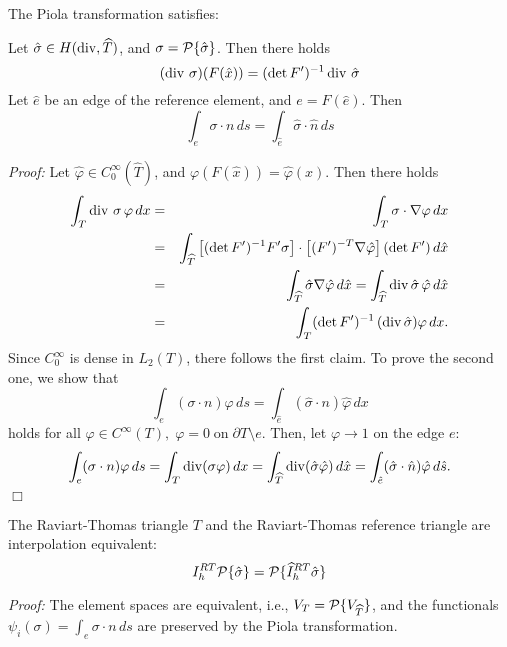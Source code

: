 The Piola transformation satisfies:
\begin{lemma} Let $\hat \sigma \in H(\operatorname{div}, \widehat T)$, and 
$\sigma = {\cal P} \{ \hat \sigma \}$. Then there holds
$$
(\operatorname{div} \, \sigma) (F (\hat x)) = (\det F^\prime)^{-1} \operatorname{div} \, \hat \sigma
$$
Let $\hat e$ be an edge of the reference element, and $e = F (\hat e)$.
Then
$$
\int_e \sigma \cdot n \, ds = \int_{\hat e} \hat \sigma \cdot \hat n \, ds
$$
\end{lemma}
{\em Proof:} Let $\widehat \varphi \in C_0^\infty (\widehat T)$, 
and $\varphi(F(\hat x)) = \widehat \varphi (x)$. Then there holds
\begin{eqnarray*}
\int_T \operatorname{div} \, \sigma \, \varphi \, dx & = & \int_T \sigma \cdot \nabla \varphi \, dx  \\
& = & \int_{\widehat T} \left[ (\operatorname{det} F^\prime)^{-1} F^\prime \sigma \right] \cdot \left[ (F^\prime)^{-T} \nabla \hat \varphi \right] (\operatorname{det} F^\prime) \, d \hat x \\
& = & \int_{\widehat T} \hat \sigma \nabla \hat \varphi \, d \hat x 
= \int_{\widehat T} \operatorname{div} \hat \sigma \, \hat \varphi \, d \hat x \\
& = & \int_T (\operatorname{det} F^\prime)^{-1} \, (\operatorname{div} \hat \sigma) \varphi \, dx.
\end{eqnarray*}
Since $C_0^\infty$ is dense in $L_2(T)$, there follows the first claim.
To prove the second one, we show that
$$
\int_e (\sigma \cdot n) \varphi \, ds = \int_{\hat e} (\hat \sigma \cdot n) \hat \varphi \, dx
$$
holds for all $\varphi \in C^\infty (T), \; \varphi = 0 \; \mbox{on} \; \partial T \setminus e$. Then, let $\varphi \rightarrow 1$ on the edge $e$:
\begin{eqnarray*}
\int_e (\sigma \cdot n) \varphi \, ds = \int_T \operatorname{div} (\sigma \varphi) \, dx
= \int_{\widehat T} \operatorname{div} (\hat \sigma \hat \varphi) \, d \hat x =
\int_{\hat e} (\hat \sigma \cdot \hat n) \hat \varphi \, d \hat s.
\end{eqnarray*}
\hfill $\Box$

\begin{lemma} The Raviart-Thomas triangle $T$ and the Raviart-Thomas
reference triangle are interpolation equivalent:
$$
I_h^{RT} { \cal P } \{ \hat \sigma \} = 
 {\cal P} \{ \widehat I_h^{RT} \hat \sigma \}
$$
\end{lemma}
{\em Proof:} The element spaces are equivalent, i.e., 
$V_T = {\cal P} \{ V_{\widehat T} \}$, and the functionals $\psi_i (\sigma) = \int_e \sigma \cdot n \, ds$ are preserved by the Piola transformation.


